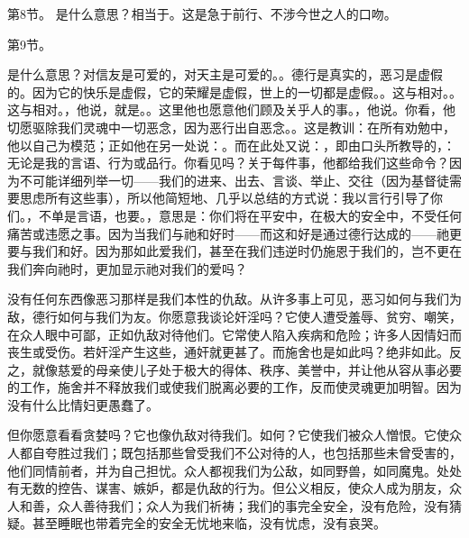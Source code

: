 第8节。 是什么意思？相当于。这是急于前行、不涉今世之人的口吻。\par

\par

第9节。\par

是什么意思？对信友是可爱的，对天主是可爱的。。德行是真实的，恶习是虚假的。因为它的快乐是虚假，它的荣耀是虚假，世上的一切都是虚假。。这与相对。。这与相对。，他说，就是。。这里他也愿意他们顾及关乎人的事。，他说。你看，他切愿驱除我们灵魂中一切恶念，因为恶行出自恶念。。这是教训：在所有劝勉中，他以自己为模范；正如他在另一处说：。而在此处又说：，即由口头所教导的，：无论是我的言语、行为或品行。你看见吗？关于每件事，他都给我们这些命令？因为不可能详细列举一切——我们的进来、出去、言谈、举止、交往（因为基督徒需要思虑所有这些事），所以他简短地、几乎以总结的方式说：我以言行引导了你们。，不单是言语，也要。，意思是：你们将在平安中，在极大的安全中，不受任何痛苦或违愿之事。因为当我们与祂和好时——而这和好是通过德行达成的——祂更要与我们和好。因为那如此爱我们，甚至在我们违逆时仍施恩于我们的，岂不更在我们奔向祂时，更加显示祂对我们的爱吗？\par

没有任何东西像恶习那样是我们本性的仇敌。从许多事上可见，恶习如何与我们为敌，德行如何与我们为友。你愿意我谈论奸淫吗？它使人遭受羞辱、贫穷、嘲笑，在众人眼中可鄙，正如仇敌对待他们。它常使人陷入疾病和危险；许多人因情妇而丧生或受伤。若奸淫产生这些，通奸就更甚了。而施舍也是如此吗？绝非如此。反之，就像慈爱的母亲使儿子处于极大的得体、秩序、美誉中，并让他从容从事必要的工作，施舍并不释放我们或使我们脱离必要的工作，反而使灵魂更加明智。因为没有什么比情妇更愚蠢了。\par

但你愿意看看贪婪吗？它也像仇敌对待我们。如何？它使我们被众人憎恨。它使众人都自夸胜过我们；既包括那些曾受我们不公对待的人，也包括那些未曾受害的，他们同情前者，并为自己担忧。众人都视我们为公敌，如同野兽，如同魔鬼。处处有无数的控告、谋害、嫉妒，都是仇敌的行为。但公义相反，使众人成为朋友，众人和善，众人善待我们；众人为我们祈祷；我们的事完全安全，没有危险，没有猜疑。甚至睡眠也带着完全的安全无忧地来临，没有忧虑，没有哀哭。\par

